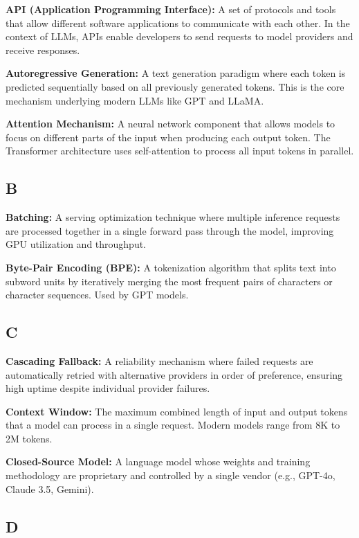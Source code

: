\documentclass[english]{article}
\begin{document}
\textbf{API (Application Programming Interface):} A set of protocols and tools that allow different software applications to communicate with each other. In the context of LLMs, APIs enable developers to send requests to model providers and receive responses.

\textbf{Autoregressive Generation:} A text generation paradigm where each token is predicted sequentially based on all previously generated tokens. This is the core mechanism underlying modern LLMs like GPT and LLaMA.

\textbf{Attention Mechanism:} A neural network component that allows models to focus on different parts of the input when producing each output token. The Transformer architecture uses self-attention to process all input tokens in parallel.

\subsection*{B}

\textbf{Batching:} A serving optimization technique where multiple inference requests are processed together in a single forward pass through the model, improving GPU utilization and throughput.

\textbf{Byte-Pair Encoding (BPE):} A tokenization algorithm that splits text into subword units by iteratively merging the most frequent pairs of characters or character sequences. Used by GPT models.

\subsection*{C}

\textbf{Cascading Fallback:} A reliability mechanism where failed requests are automatically retried with alternative providers in order of preference, ensuring high uptime despite individual provider failures.

\textbf{Context Window:} The maximum combined length of input and output tokens that a model can process in a single request. Modern models range from 8K to 2M tokens.

\textbf{Closed-Source Model:} A language model whose weights and training methodology are proprietary and controlled by a single vendor (e.g., GPT-4o, Claude 3.5, Gemini).

\subsection*{D}
\end{document}
